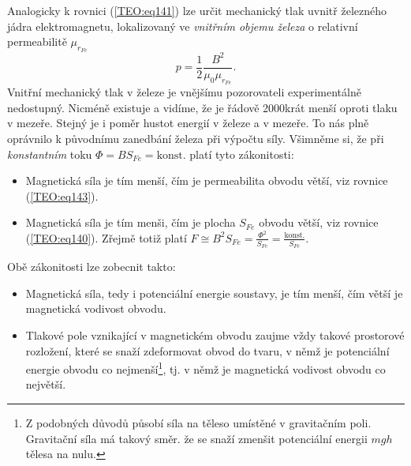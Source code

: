       Analogicky k rovnici (\ref{TEO:eq141}) lze určit mechanický tlak uvnitř železného jádra
      elektromagnetu, lokalizovaný ve \emph{vnitřním objemu železa} o relativní permeabilitě
      \(\mu_{r_{Fe}}\)
      \begin{equation}\label{TEO:eq143}
       p = \frac{1}{2}\frac{B^2}{\mu_0\mu_{r_{Fe}}}.
      \end{equation}
      Vnitřní mechanický tlak v železe je vnějšímu pozorovateli experimentálně nedostupný. Nicméně
      existuje a vidíme, že je řádově 2000krát menší oproti tlaku v mezeře. Stejný je i poměr hustot
      energií v železe a v mezeře. To nás plně oprávnilo k původnímu zanedbání železa při výpočtu
      síly. Všimněme si, že při \emph{konstantním} toku \(\Phi = BS_{Fe} = \text{konst}\). platí
      tyto zákonitosti:
      \begin{itemize}[noitemsep]
        \item Magnetická síla je tím menší, čím je permeabilita obvodu větší, viz rovnice     
              (\ref{TEO:eq143}).
        \item Magnetická síla je tím menši, čím je plocha \(S_{Fe}\) obvodu větší, viz rovnice 
              (\ref{TEO:eq140}). Zřejmě totiž platí \(F \cong B^2S_{Fe} = 
              \frac{\Phi^2}{S_{Fe}} = \frac{\text{konst.}}{S_{Fe}}\).
      \end{itemize}
      Obě zákonitosti lze zobecnit takto:
      \begin{itemize}[noitemsep]
        \item Magnetická síla, tedy i potenciální energie soustavy, je tím menší, čím větší je    
              magnetická vodivost obvodu.
        \item Tlakové pole vznikající v magnetickém obvodu zaujme vždy takové prostorové rozložení,
              které se snaží zdeformovat obvod do tvaru, v němž je potenciální energie obvodu co
              nejmenší\footnote{Z podobných důvodů působí síla na těleso umístěné v gravitačním
              poli. Gravitační síla má takový směr. že se snaží zmenšit potenciální energii \(mgh\)
              tělesa na nulu.}, tj. v němž je magnetická vodivost obvodu co největší.
      \end{itemize}
      
